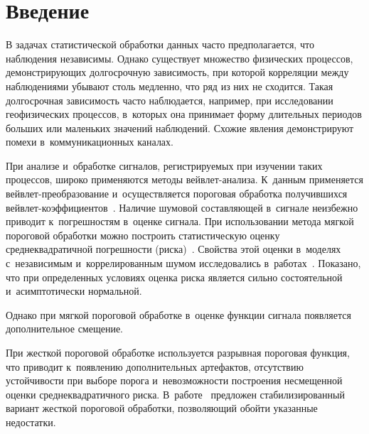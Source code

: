
  
\vspace*{6pt}



\thispagestyle{headings}

\begin{multicols}{2}

\label{st\stat}

\section{Введение}

В задачах статистической обработки данных час\-то предполагается, что наблюдения 
независимы. Однако существует множество физических процессов, де\-мон\-ст\-ри\-ру\-ющих 
долгосрочную за\-ви\-си\-мость, при которой корреляции между наблюдениями убывают 
столь медленно, что ряд из них не сходится. Такая долгосрочная за\-ви\-си\-мость 
час\-то наблюдается, например, при исследовании геофизических процессов, в~которых 
она принимает форму длительных периодов больших или маленьких значений наблюдений. 
Схожие явления демонстрируют помехи в~коммуникационных каналах. 

При 
анализе и~обработке сигналов, ре\-гист\-ри\-ру\-емых при изучении таких процессов, 
широко применяют\-ся методы вейв\-лет-ана\-ли\-за. К~данным применяется 
вейв\-лет-пре\-об\-ра\-зо\-ва\-ние и~осуществляется пороговая обработка получившихся 
вейв\-лет-ко\-эф\-фи\-ци\-ен\-тов~\cite{Mall99}. Наличие шумовой со\-став\-ля\-ющей 
в~сигнале неизбежно приводит к~погрешностям в~оценке сигнала. При использовании 
метода мягкой пороговой обработки мож\-но по\-стро\-ить статистическую оценку 
среднеквадратичной по\-греш\-ности (рис\-ка)~\cite{DonJ95}. Свойства этой оценки в~моделях 
с~независимым и~коррелированным шумом исследовались 
в~работах~\cite{Mar09,MSH10-1,SH12-1,ESH14,SH16}. Показано, что при определенных 
условиях оценка рис\-ка является сильно со\-сто\-ятель\-ной и~асимптотически нормальной.

Однако при мягкой пороговой обработке в~оценке функции сигнала появляется 
дополнительное смещение. 

При жесткой пороговой обработке используется разрывная 
пороговая функция, что приводит к~появлению дополнительных артефактов, 
отсутствию устой\-чи\-вости при выборе порога и~не\-воз\-мож\-ности по\-стро\-ения 
несмещенной оценки сред\-не\-квад\-ра\-тич\-но\-го риска. 
В~работе~\cite{HL10} предложен стабилизированный вариант жесткой пороговой обработки, 
позволяющий обойти указанные недостатки. 


\end{multicols}
